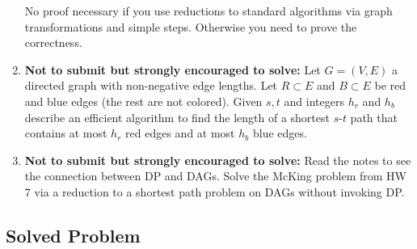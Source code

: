 \documentclass[11pt]{article}
\begin{document}
\begin{enumerate}
  No proof necessary if you use reductions to standard algorithms via
  graph transformations and simple steps. Otherwise you need to prove
  the correctness.


\item {\bf Not to submit but strongly encouraged to solve:} Let $G=(V,E)$ a directed graph with non-negative edge
  lengths. Let $R \subset E$ and $B \subset E$ be red and blue edges
  (the rest are not colored).  Given $s,t$ and integers $h_r$ and
  $h_b$ describe an efficient algorithm to find the length of a
  shortest $s$-$t$ path that contains at most $h_r$ red edges and at
  most $h_b$ blue edges.

\item {\bf Not to submit but strongly encouraged to solve:} Read the notes to see the connection
  between DP and DAGs. Solve the McKing problem from HW 7 via a
  reduction to a shortest path problem on DAGs without invoking DP.
\end{enumerate}

\vspace{1in}
\subsection*{Solved Problem}
\end{document}

